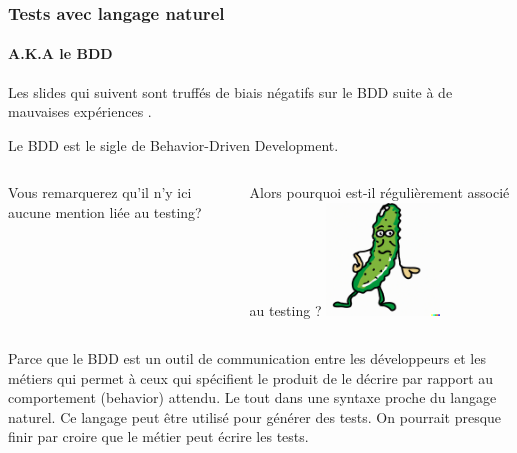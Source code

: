 \documentclass{beamer}
\begin{document}
    \begin{frame}
        \frametitle{Tests avec langage naturel}
        \framesubtitle{A.K.A le BDD}
        \transdissolve

        \begin{dangercolorbox}
            Les slides qui suivent sont truffés de biais négatifs sur le BDD suite à de mauvaises expériences .

        \end{dangercolorbox}
        Le BDD est le sigle de Behavior-Driven Development.
                \begin{columns}
            Vous remarquerez qu'il n'y ici aucune mention liée au testing?

            Alors pourquoi est-il régulièrement associé au testing ?
            \centering
            \includegraphics[width=3cm]{image/funny-drawing-of-a-cucumber}
        \end{columns}
        Parce que le BDD est un outil de communication entre les développeurs et les métiers qui permet à ceux qui spécifient le produit de le décrire par rapport au comportement (behavior) attendu.
        Le tout dans une syntaxe proche du langage naturel.
        Ce langage peut être utilisé pour générer des tests.
        On pourrait presque finir par croire que le métier peut écrire les tests.
    \end{frame}
\end{document}
